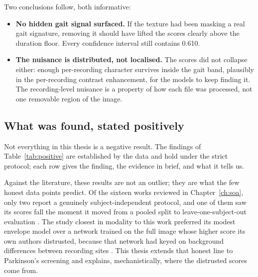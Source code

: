 Two conclusions follow, both informative:

\begin{itemize}
  \item \textbf{No hidden gait signal surfaced.} If the texture had been
        masking a real gait signature, removing it should have lifted the
        scores clearly above the duration floor. Every confidence interval
        still contains 0.610.
  \item \textbf{The nuisance is distributed, not localised.} The scores did
        not collapse either: enough per-recording character survives inside
        the gait band, plausibly in the per-recording contrast enhancement,
        for the models to keep finding it. The recording-level nuisance is a
        property of how each file was processed, not one removable region of
        the image.
\end{itemize}

\subsection{What was found, stated positively}
\label{sec:disc-positive}

Not everything in this thesis is a negative result. The findings of
Table~\ref{tab:positive} are established by the data and hold under the
strict protocol; each row gives the finding, the evidence in brief, and what
it tells us.

Against the literature, these results are not an outlier; they are what the
few honest data points predict. Of the sixteen works reviewed in
Chapter~\ref{ch:soa}, only two report a genuinely subject-independent protocol, and one
of them saw its scores fall the moment it moved from a pooled split to
leave-one-subject-out evaluation \cite{fard2026}. The study closest in modality to
this work preferred its modest envelope model over a network trained on the full image
whose higher score its own authors distrusted, because that network had
keyed on background differences between recording sites \cite{hayashi2021}.
This thesis extends that honest line to Parkinson's screening and explains,
mechanistically, where the distrusted scores come from.

